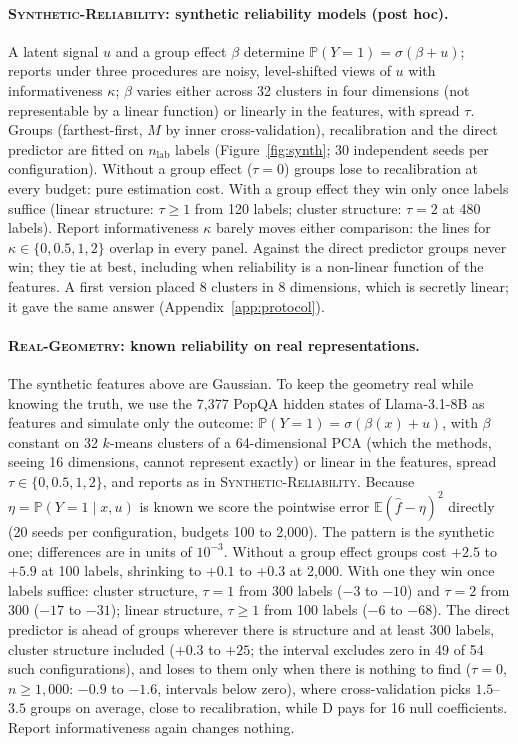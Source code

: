 \documentclass[twoside]{article}
\theoremstyle{definition}
\theoremstyle{remark}
\newcommand{\E}{\mathbb{E}}
\renewcommand{\P}{\mathbb{P}}
\newcommand{\1}{\mathbf{1}}
\newcommand{\expname}[1]{\textsc{#1}}
\begin{document}
\paragraph{\expname{Synthetic-Reliability}: synthetic reliability models (post hoc).} A latent signal $u$ and a group
effect $\beta$ determine $\P(Y=1)=\sigma(\beta+u)$; reports under three procedures are noisy,
level-shifted views of $u$ with informativeness $\kappa$; $\beta$ varies either across 32 clusters in
four dimensions (not representable by a linear function) or linearly in the features, with spread
$\tau$. Groups (farthest-first, $M$ by inner cross-validation), recalibration and the direct predictor
are fitted on $n_{\mathrm{lab}}$ labels (Figure~\ref{fig:synth}; 30 independent seeds per
configuration). Without a group effect ($\tau=0$) groups lose to recalibration at every budget: pure
estimation cost. With a group effect they win only once labels suffice (linear structure: $\tau\ge1$
from 120 labels; cluster structure: $\tau=2$ at 480 labels). Report informativeness $\kappa$ barely
moves either comparison: the lines for $\kappa\in\{0,0.5,1,2\}$ overlap in every panel. Against the
direct predictor groups never win; they tie at best, including when reliability is a non-linear
function of the features. A first version placed 8 clusters in 8 dimensions, which is secretly linear;
it gave the same answer (Appendix~\ref{app:protocol}).

\paragraph{\expname{Real-Geometry}: known reliability on real representations.} The synthetic
features above are Gaussian. To keep the geometry real while knowing the truth, we use the 7{,}377
PopQA hidden states of Llama-3.1-8B as features and simulate only the outcome:
$\P(Y=1)=\sigma(\beta(x)+u)$, with $\beta$ constant on 32 $k$-means clusters of a 64-dimensional PCA
(which the methods, seeing 16 dimensions, cannot represent exactly) or linear in the features, spread
$\tau\in\{0,0.5,1,2\}$, and reports as in \expname{Synthetic-Reliability}. Because $\eta=\P(Y=1\mid x,u)$ is known we
score the pointwise error $\E(\hat f-\eta)^2$ directly (20 seeds per configuration, budgets 100 to
2{,}000). The pattern is the synthetic one; differences are in units of $10^{-3}$. Without a group effect
groups cost $+2.5$ to $+5.9$ at 100 labels, shrinking to $+0.1$ to $+0.3$ at 2{,}000. With one they win
once labels suffice: cluster structure, $\tau=1$ from 300 labels ($-3$ to $-10$) and $\tau=2$ from 300
($-17$ to $-31$); linear structure, $\tau\ge1$ from 100 labels ($-6$ to $-68$). The direct predictor is ahead of
groups wherever there is structure and at least 300 labels, cluster structure included ($+0.3$ to $+25$; the interval excludes zero in 49 of 54 such configurations),
and loses to them only when there is nothing to find ($\tau=0$, $n\ge1{,}000$: $-0.9$ to $-1.6$, intervals
below zero), where cross-validation picks $1.5$--$3.5$ groups on average, close to recalibration, while D pays for 16 null coefficients. Report informativeness again changes
nothing.
\end{document}
